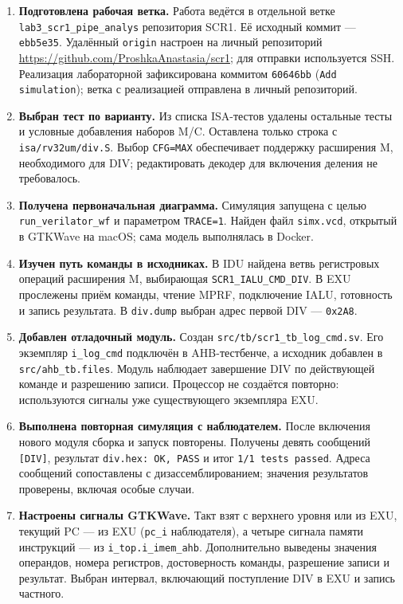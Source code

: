 \documentclass[
  russian,
]{article}
\begin{document}
\begin{enumerate}
\item \textbf{Подготовлена рабочая ветка.}
Работа ведётся в отдельной ветке \texttt{lab3\_scr1\_pipe\_analys}
репозитория SCR1. Её исходный коммит --- \texttt{ebb5e35}.
Удалённый \texttt{origin} настроен на личный репозиторий
\url{https://github.com/ProshkaAnastasia/scr1}; для отправки используется SSH.
Реализация лабораторной зафиксирована коммитом \texttt{60646bb}\newline
(\texttt{Add simulation}); ветка с реализацией отправлена в личный репозиторий.

\item \textbf{Выбран тест по варианту.}
Из списка ISA-тестов удалены остальные тесты и условные добавления
наборов M/C. Оставлена только строка с \texttt{isa/rv32um/div.S}.
Выбор \texttt{CFG=MAX} обеспечивает поддержку расширения M,
необходимого для DIV; редактировать декодер для включения деления не требовалось.

\item \textbf{Получена первоначальная диаграмма.}
Симуляция запущена с целью \texttt{run\_verilator\_wf} и параметром
\texttt{TRACE=1}. Найден файл \texttt{simx.vcd}, открытый в GTKWave
на macOS; сама модель выполнялась в Docker.

\item \textbf{Изучен путь команды в исходниках.}
В IDU найдена ветвь регистровых операций расширения M, выбирающая
\texttt{SCR1\_IALU\_CMD\_DIV}. В EXU прослежены приём команды,
чтение MPRF, подключение IALU, готовность и запись результата.
В \texttt{div.dump} выбран адрес первой DIV --- \texttt{0x2A8}.

\item \textbf{Добавлен отладочный модуль.}
Создан \texttt{src/tb/scr1\_tb\_log\_cmd.sv}.
Его экземпляр \texttt{i\_log\_cmd} подключён в AHB-тестбенче,
а исходник добавлен в \texttt{src/ahb\_tb.files}.
Модуль наблюдает завершение DIV по действующей команде и разрешению
записи. Процессор не создаётся повторно: используются сигналы уже
существующего экземпляра EXU.

\item \textbf{Выполнена повторная симуляция с наблюдателем.}
После включения нового модуля сборка и запуск повторены.
Получены девять сообщений \texttt{[DIV]}, результат
\texttt{div.hex: OK, PASS} и итог \texttt{1/1 tests passed}.
Адреса сообщений сопоставлены с дизассемблированием;
значения результатов проверены, включая особые случаи.

\item \textbf{Настроены сигналы GTKWave.}
Такт взят с верхнего уровня или из EXU, текущий PC --- из EXU
(\texttt{pc\_i} наблюдателя), а четыре сигнала памяти инструкций ---
из \texttt{i\_top.i\_imem\_ahb}.
Дополнительно выведены значения операндов, номера регистров,
достоверность команды, разрешение записи и результат.
Выбран интервал, включающий поступление DIV в EXU и запись частного.


\end{enumerate}
\end{document}
